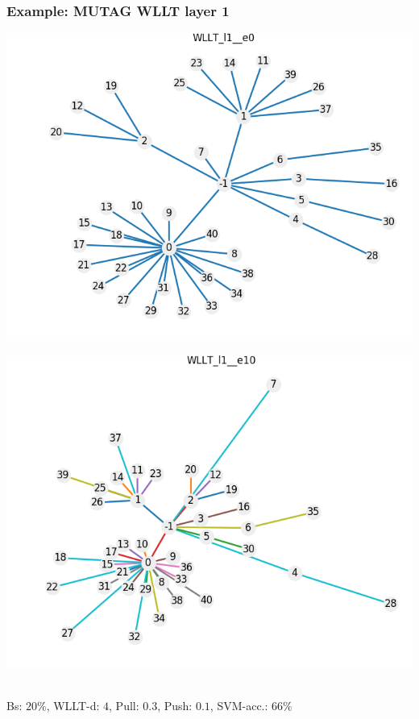 \begin{frame}\frametitle{Example: MUTAG WLLT layer 1}
	\begin{minipage}{0.49\textwidth}
		\includegraphics[width=\textwidth]{images/plotWlltl2}
	\end{minipage}
	\begin{minipage}{0.49\textwidth}
		\includegraphics[width=\textwidth]{images/plotWlltl3}
	\end{minipage}
	\vspace{2cm} \\
	\tiny{Bs: $20\%$, WLLT-d: $4$, Pull: $0.3$, Push: $0.1$, SVM-acc.: $66\%$}
\end{frame}

